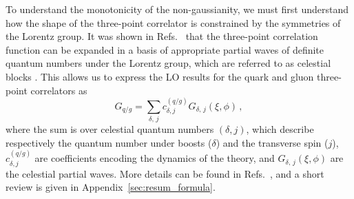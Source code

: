 \documentclass[letterpaper,11pt]{article}
\def\App#1{Appendix~\ref{#1}}
\DeclareRobustCommand{\App}[1]{App.~\ref{#1}}
\DeclareRobustCommand{\Refs}[1]{Refs.~\cite{#1}}
\begin{document}
To understand the monotonicity of the non-gaussianity, we must first understand how the shape of the three-point correlator is constrained by the symmetries of the Lorentz group. It was shown in \Refs{Chang:2022ryc,Chen:2022jhb} that the three-point correlation function can be expanded in a basis of appropriate partial waves of definite quantum numbers under the Lorentz group, which are referred to as celestial blocks \cite{Chang:2022ryc,Chen:2022jhb}. This allows us to express the LO results for the quark and gluon three-point correlators as
\begin{equation}\label{eq:cb_expand}
G_{q/g} = \sum_{\delta,\,j} c_{\delta,j}^{(q/g)} G_{\delta,\,j}(\xi,\phi)\,,
\end{equation}
where the sum is over celestial quantum numbers $(\delta, j)$, which describe respectively the quantum number under boosts ($\delta$) and the transverse spin ($j$), $c_{\delta,j}^{(q/g)}$ are coefficients encoding the dynamics of the theory, and $G_{\delta,\,j}(\xi,\phi)$ are the celestial partial waves. More details can be found in \Refs{Chang:2022ryc,Chen:2022jhb}, and a short review is given in \App{sec:resum_formula}.
\end{document}
